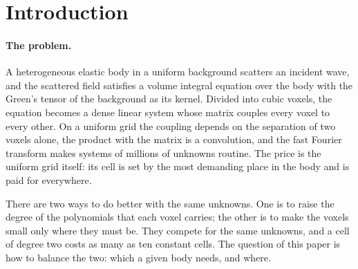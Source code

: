 \documentclass[11pt,a4paper]{article}
\begin{document}
\section{Introduction}\label{sec:intro}

\paragraph{The problem.} A heterogeneous elastic body in a uniform background scatters an incident wave,
and the scattered field satisfies a volume integral equation over the body with the Green's tensor of
the background as its kernel. Divided into cubic voxels, the equation becomes a dense linear system
whose matrix couples every voxel to every other. On a uniform grid the coupling depends on the
separation of two voxels alone, the product with the matrix is a convolution, and the fast Fourier
transform makes systems of millions of unknowns routine. The price is the uniform grid itself: its cell
is set by the most demanding place in the body and is paid for everywhere.

There are two ways to do better with the same unknowns. One is to raise the degree of the polynomials
that each voxel carries; the other is to make the voxels small only where they must be. They compete for
the same unknowns, and a cell of degree two costs as many as ten constant cells. The question of this
paper is how to balance the two: which a given body needs, and where.
\end{document}
